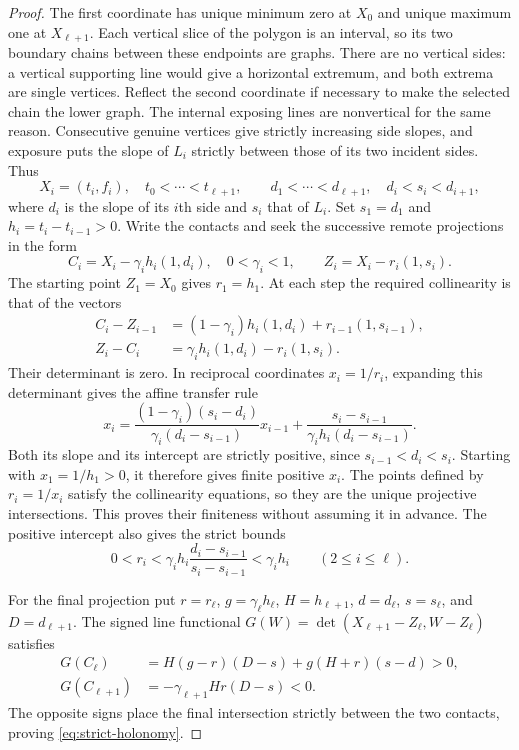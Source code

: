 \documentclass[11pt,a4paper]{article}
\theoremstyle{definition}
\theoremstyle{remark}
\numberwithin{equation}{section}
\begin{document}
\begin{proof}
The first coordinate has unique minimum zero at $X_0$ and unique maximum
one at $X_{\ell+1}$.  Each vertical slice of the polygon is an interval,
so its two boundary chains between these endpoints are graphs.  There
are no vertical sides: a vertical supporting line would give a horizontal
extremum, and both extrema are single vertices.  Reflect the second
coordinate if necessary to make the selected chain the lower graph.
The internal exposing lines are nonvertical for the same reason.
Consecutive genuine vertices give strictly increasing side slopes, and
exposure puts the slope of $L_i$ strictly between those of its two
incident sides.
Thus
\[
 X_i=(t_i,f_i),\quad t_0<\cdots<t_{\ell+1},\qquad
 d_1<\cdots<d_{\ell+1},\quad d_i<s_i<d_{i+1},
\]
where $d_i$ is the slope of its $i$th side and $s_i$ that of $L_i$.
Set $s_1=d_1$ and $h_i=t_i-t_{i-1}>0$.  Write the contacts and seek the
successive remote projections in the form
\[
 C_i=X_i-\gamma_i h_i(1,d_i),\quad0<\gamma_i<1,
 \qquad Z_i=X_i-r_i(1,s_i).
\]
The starting point $Z_1=X_0$ gives $r_1=h_1$.  At each step the required
collinearity is that of the vectors
\[
 \begin{split}
 C_i-Z_{i-1}&=(1-\gamma_i)h_i(1,d_i)+r_{i-1}(1,s_{i-1}),\\
 Z_i-C_i&=\gamma_i h_i(1,d_i)-r_i(1,s_i).
 \end{split}
\]
Their determinant is zero.  In reciprocal coordinates $x_i=1/r_i$,
expanding this determinant gives the affine transfer rule
\begin{equation}\label{eq:positive-transfer}
 x_i=\frac{(1-\gamma_i)(s_i-d_i)}{\gamma_i(d_i-s_{i-1})}x_{i-1}
       +\frac{s_i-s_{i-1}}{\gamma_i h_i(d_i-s_{i-1})}.
\end{equation}
Both its slope and its intercept are strictly positive, since
$s_{i-1}<d_i<s_i$.  Starting with $x_1=1/h_1>0$, it therefore gives
finite positive $x_i$.  The points defined by $r_i=1/x_i$ satisfy the
collinearity equations, so they are the unique projective intersections.
This proves their finiteness without assuming it in advance.
The positive intercept also gives the strict bounds
\[
 0<r_i<\gamma_i h_i\frac{d_i-s_{i-1}}{s_i-s_{i-1}}
          <\gamma_i h_i\qquad(2\le i\le\ell).
\]

For the final projection put $r=r_\ell$, $g=\gamma_{\ell}h_{\ell}$,
$H=h_{\ell+1}$, $d=d_\ell$, $s=s_\ell$, and $D=d_{\ell+1}$.  The signed line
functional $G(W)=\det(X_{\ell+1}-Z_\ell,W-Z_\ell)$ satisfies
\[
 \begin{split}
 G(C_\ell)&=H(g-r)(D-s)+g(H+r)(s-d)>0,\\
 G(C_{\ell+1})&=-\gamma_{\ell+1}Hr(D-s)<0.
 \end{split}
\]
The opposite signs place the final intersection strictly between the
two contacts, proving \eqref{eq:strict-holonomy}.


\end{proof}
\end{document}
